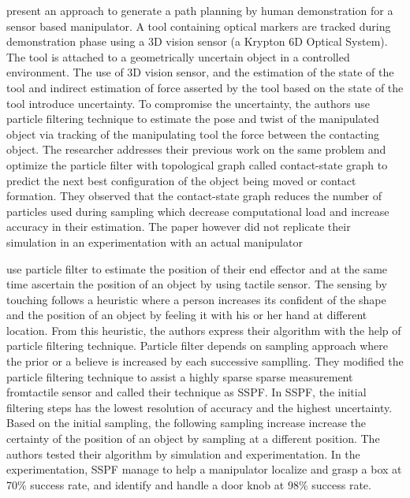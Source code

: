 \textcite{Meeussen2007} present an approach to generate a path planning by human
demonstration for a sensor based manipulator. A tool containing optical markers are tracked
during demonstration phase using a 3D vision sensor (a Krypton 6D Optical System). The tool is
attached to a geometrically uncertain object in a controlled environment. The use of 3D vision
sensor, and the estimation of the state of the tool and indirect estimation of force asserted by
the tool based on the state of the tool introduce uncertainty. To compromise the uncertainty, the
authors use particle filtering technique to estimate the pose and twist of the manipulated object
via tracking of the manipulating tool the force between the contacting object. The researcher
addresses their previous work on the same problem and optimize the particle filter with
topological graph called contact-state graph to predict the next best configuration of the object
being moved or contact formation. They observed that the contact-state graph reduces the
number of particles used during sampling which decrease computational load and increase
accuracy in their estimation. The paper however did not replicate their simulation in an
experimentation with an actual manipulator

\textcite{Petrovskaya2006} use particle filter to estimate the position of their end effector
and at the same time ascertain the position of an object by using tactile sensor. The sensing by
touching follows a heuristic where a person increases its confident of the shape and the position
of an object by feeling it with his or her hand at different location. From this heuristic, the authors
express their algorithm with the help of particle filtering technique. Particle filter depends on
sampling approach where the prior or a believe is increased by each successive samplling.
They modified the particle filtering technique to assist a highly sparse sparse measurement
fromtactile sensor and called their technique as \acrfull{SSPF}. In SSPF, the initial
filtering steps has the lowest resolution of accuracy and the highest uncertainty. Based on the
initial sampling, the following sampling increase increase the certainty of the position of an
object by sampling at a different position. The authors tested their algorithm by simulation and
experimentation. In the experimentation, SSPF manage to help a manipulator localize and
grasp a box at 70\% success rate, and identify and handle a door knob at 98\% success rate.

